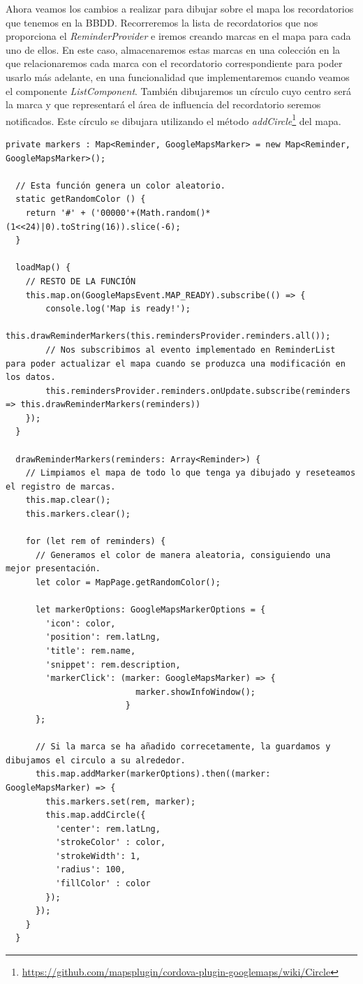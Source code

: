 Ahora veamos los cambios a realizar para dibujar sobre el mapa los recordatorios que tenemos en la \gls{BBDD}. Recorreremos la lista de recordatorios que nos proporciona el \emph{ReminderProvider} e iremos creando marcas en el mapa para cada uno de ellos. En este caso, almacenaremos estas marcas en una colección en la que relacionaremos cada marca con el recordatorio correspondiente para poder usarlo más adelante, en una funcionalidad que implementaremos cuando veamos el componente \emph{ListComponent}. También dibujaremos un círculo cuyo centro será la marca y que representará el área de influencia del recordatorio seremos notificados. Este círculo se dibujara utilizando el método \emph{addCircle}\footnote{\url{https://github.com/mapsplugin/cordova-plugin-googlemaps/wiki/Circle}} del mapa.

\begin{lstlisting}[style=htmlcssjs,frame=tlrb,xleftmargin={0.2cm}]
  private markers : Map<Reminder, GoogleMapsMarker> = new Map<Reminder, GoogleMapsMarker>();

  // Esta función genera un color aleatorio.
  static getRandomColor () {
    return '#' + ('00000'+(Math.random()*(1<<24)|0).toString(16)).slice(-6);
  }

  loadMap() {
    // RESTO DE LA FUNCIÓN
    this.map.on(GoogleMapsEvent.MAP_READY).subscribe(() => {
        console.log('Map is ready!');
        this.drawReminderMarkers(this.remindersProvider.reminders.all());
        // Nos subscribimos al evento implementado en ReminderList para poder actualizar el mapa cuando se produzca una modificación en los datos.
        this.remindersProvider.reminders.onUpdate.subscribe(reminders => this.drawReminderMarkers(reminders))
    });
  }

  drawReminderMarkers(reminders: Array<Reminder>) {
    // Limpiamos el mapa de todo lo que tenga ya dibujado y reseteamos el registro de marcas.
    this.map.clear();
    this.markers.clear();

    for (let rem of reminders) {
      // Generamos el color de manera aleatoria, consiguiendo una mejor presentación.
      let color = MapPage.getRandomColor();

      let markerOptions: GoogleMapsMarkerOptions = {
        'icon': color,
        'position': rem.latLng,
        'title': rem.name,
        'snippet': rem.description,
        'markerClick': (marker: GoogleMapsMarker) => {
                          marker.showInfoWindow();
                        }
      };

      // Si la marca se ha añadido correcetamente, la guardamos y dibujamos el circulo a su alrededor.
      this.map.addMarker(markerOptions).then((marker: GoogleMapsMarker) => {
        this.markers.set(rem, marker);
        this.map.addCircle({
          'center': rem.latLng,
          'strokeColor' : color,
          'strokeWidth': 1,
          'radius': 100,
          'fillColor' : color
        });
      });
    }
  }
\end{lstlisting}

